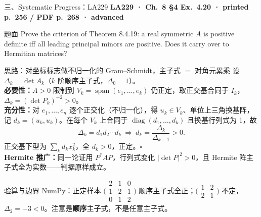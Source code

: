 \documentclass[aspectratio=169,10pt,fontset=none]{ctexbeamer}
\newcommand{\ex}[1]{\textcolor{accent}{\footnotesize\bfseries #1}}
\begin{document}
\begin{frame}[t]{三、Systematic Progress：LA229}
  \leavevmode\ex{LA229 · Ch.~8 §4 Ex.~4.20 · printed p.~256 / PDF p.~268 · advanced}
  \begin{block}{\footnotesize 题面}
    \scriptsize Prove the criterion of Theorem 8.4.19: a real symmetric $A$ is positive definite iff all leading principal minors are positive. Does it carry over to Hermitian matrices?
  \end{block}
  \begin{exampleblock}{\footnotesize 思路：对坐标标志做不归一化的 Gram--Schmidt，主子式 $=$ 对角元累乘}
    \scriptsize
    设 $\Delta_k=\det A_k$（$k$ 阶顺序主子式，$\Delta_0=1$）。\\
    \textbf{必要性：}$A>0$ 限制到 $V_k=\operatorname{span}(e_1,\ldots,e_k)$ 仍正定，取正交基合同于 $I_k$，$\Delta_k=(\det P_k)^{-2}>0$。\\
    \textbf{充分性：}对 $e_1,\ldots,e_n$ 逐个正交化（不归一化），得 $u_k\in V_k$、单位上三角换基阵，记 $d_k=(u_k,u_k)$。在每个 $V_k$ 上合同于 $\operatorname{diag}(d_1,\ldots,d_k)$ 且换基行列式为 1，故
    $$\Delta_k=d_1d_2\cdots d_k\ \Longrightarrow\ d_k=\frac{\Delta_k}{\Delta_{k-1}}>0.$$
    正交基下型为 $\sum_kd_kx_k^2$，全 $d_k>0$，正定。$\square$\\
    \textbf{Hermite 推广：}同一论证用 $P^*AP$，行列式变化 $|\det P|^2>0$，且 Hermite 阵主子式全为实数——判据原样成立。
  \end{exampleblock}
  \begin{block}{\footnotesize 验算与边界}
    \scriptsize NumPy：正定样本 $\bigl(\begin{smallmatrix}2&1&0\\1&2&1\\0&1&2\end{smallmatrix}\bigr)$ 顺序主子式全正；$\bigl(\begin{smallmatrix}1&2\\2&1\end{smallmatrix}\bigr)$ 不定，$\Delta_2=-3<0$。注意是\textbf{顺序}主子式，不是任意主子式。
  \end{block}
\end{frame}
\end{document}
